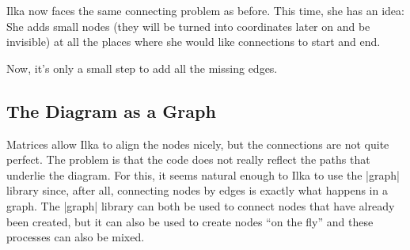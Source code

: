 Ilka now faces the same connecting problem as before. This time, she has an
idea: She adds small nodes (they will be turned into coordinates later on and
be invisible) at all the places where she would like connections to start and
end.
%
\begin{codeexample}[libraries/tikz={shapes.misc}]
\end{codeexample}
%
Now, it's only a small step to add all the missing edges.


\subsection{The Diagram as a Graph}

Matrices allow Ilka to align the nodes nicely, but the connections are not
quite perfect. The problem is that the code does not really reflect the paths
that underlie the diagram. For this, it seems natural enough to Ilka to use the
|graph| library since, after all, connecting nodes by edges is exactly what
happens in a graph. The |graph| library can both be used to connect nodes that
have already been created, but it can also be used to create nodes ``on the
fly'' and these processes can also be mixed.


